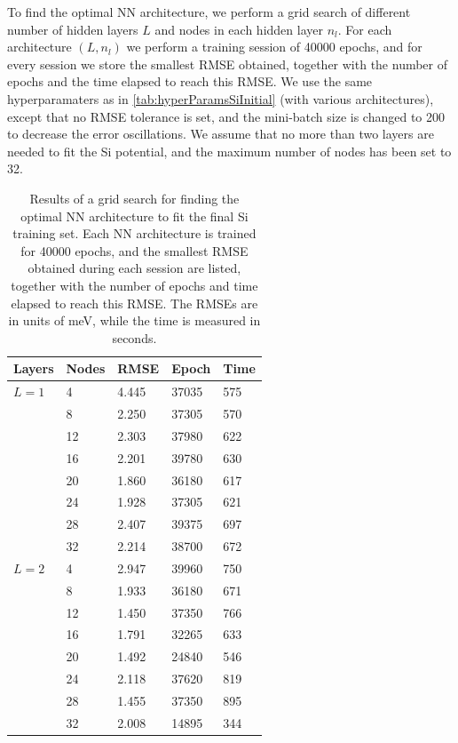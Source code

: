 \documentclass[twoside,english]{uiofysmaster}
\begin{document}
To find the optimal NN architecture, we perform a grid search of different 
number of hidden layers $L$ and nodes in each hidden layer $n_l$. 
For each architecture $(L,n_l)$ we perform a training session of 40000 epochs, and for every session we store 
the smallest RMSE obtained, together with the number of epochs and the time elapsed to reach this RMSE. 
We use the same hyperparamaters as in \autoref{tab:hyperParamsSiInitial} (with various architectures), 
except that no RMSE tolerance is set, and the mini-batch size is changed to 200 to decrease the error oscillations. 
We assume that no more than two layers are needed to fit the Si potential, and the maximum number of nodes has been 
set to 32.
\begin{table} 
\centering
    \begin{tabular*}{10cm}{l @{\extracolsep{\fill}} llll}
      \toprule
      Layers & Nodes & RMSE & Epoch & Time \\ 
      \hline
      $L=1$ & 4  & 4.445 & 37035 & 575 \\
            & 8  & 2.250 & 37305 & 570 \\
            & 12 & 2.303 & 37980 & 622 \\
            & 16 & 2.201 & 39780 & 630 \\
            & 20 & 1.860 & 36180 & 617 \\ 
            & 24 & 1.928 & 37305 & 621 \\
            & 28 & 2.407 & 39375 & 697 \\
            & 32 & 2.214 & 38700 & 672 \\
      $L=2$ & 4  & 2.947 & 39960 & 750 \\
            & 8  & 1.933 & 36180 & 671 \\
            & 12 & 1.450 & 37350 & 766 \\
            & 16 & 1.791 & 32265 & 633 \\
            & 20 & 1.492 & 24840 & 546 \\
            & 24 & 2.118 & 37620 & 819 \\
            & 28 & 1.455 & 37350 & 895 \\
            & 32 & 2.008 & 14895 & 344 \\
      \bottomrule
      \end{tabular*} 
    \captionsetup{width=12cm}
      \caption{Results of a grid search for finding the optimal NN architecture to fit the final Si training set. 
               Each NN architecture is trained for 40000 epochs, and the smallest RMSE obtained during each session
               are listed, together with the number of epochs and time elapsed to reach this RMSE. 
               The RMSEs are in units of meV, while the time is measured in seconds.} 
  \label{tab:gridSearch} 
\end{table}
\end{document}
